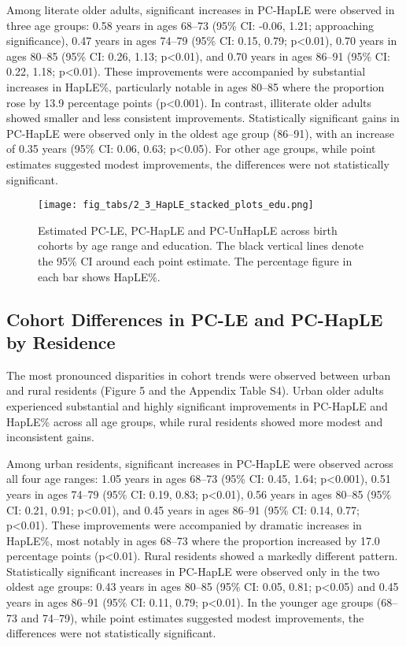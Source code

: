 \documentclass[12pt, a4paper]{article}
\begin{document}
Among literate older adults, significant increases in PC-HapLE were observed in three age groups: 0.58 years in ages 68–73 (95\% CI: -0.06, 1.21; approaching significance), 0.47 years in ages 74–79 (95\% CI: 0.15, 0.79; p<0.01), 0.70 years in ages 80–85 (95\% CI: 0.26, 1.13; p<0.01), and 0.70 years in ages 86–91 (95\% CI: 0.22, 1.18; p<0.01). These improvements were accompanied by substantial increases in HapLE\%, particularly notable in ages 80–85 where the proportion rose by 13.9 percentage points (p<0.001). In contrast, illiterate older adults showed smaller and less consistent improvements. Statistically significant gains in PC-HapLE were observed only in the oldest age group (86–91), with an increase of 0.35 years (95\% CI: 0.06, 0.63; p<0.05). For other age groups, while point estimates suggested modest improvements, the differences were not statistically significant.

\begin{figure}[!p]
  \centering
  \texttt{[image: fig\_tabs/2\_3\_HapLE\_stacked\_plots\_edu.png]}
  \caption{Estimated PC-LE, PC-HapLE and PC-UnHapLE across birth cohorts by age range and education. The black vertical lines denote the 95\% CI around each point estimate. The percentage figure in each bar shows HapLE\%.}
\end{figure}

\subsection{Cohort Differences in PC-LE and PC-HapLE by Residence}

The most pronounced disparities in cohort trends were observed between urban and rural residents (Figure 5 and the Appendix Table S4). Urban older adults experienced substantial and highly significant improvements in PC-HapLE and HapLE\% across all age groups, while rural residents showed more modest and inconsistent gains.

Among urban residents, significant increases in PC-HapLE were observed across all four age ranges: 1.05 years in ages 68–73 (95\% CI: 0.45, 1.64; p<0.001), 0.51 years in ages 74–79 (95\% CI: 0.19, 0.83; p<0.01), 0.56 years in ages 80–85 (95\% CI: 0.21, 0.91; p<0.01), and 0.45 years in ages 86–91 (95\% CI: 0.14, 0.77; p<0.01). These improvements were accompanied by dramatic increases in HapLE\%, most notably in ages 68–73 where the proportion increased by 17.0 percentage points (p<0.01). Rural residents showed a markedly different pattern. Statistically significant increases in PC-HapLE were observed only in the two oldest age groups: 0.43 years in ages 80–85 (95\% CI: 0.05, 0.81; p<0.05) and 0.45 years in ages 86–91 (95\% CI: 0.11, 0.79; p<0.01). In the younger age groups (68–73 and 74–79), while point estimates suggested modest improvements, the differences were not statistically significant.
\end{document}
